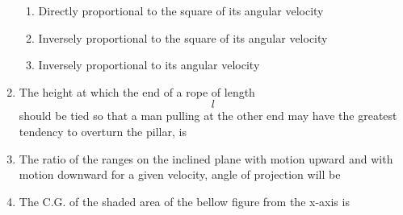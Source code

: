 \documentclass[11pt,a4paper]{article}
\begin{document}
\begin{enumerate}
\begin{enumerate}[label=\Alph*.]
\item{Directly proportional to the square of its angular velocity}
\item{Inversely proportional to the square of its angular velocity}
\item{Inversely proportional to its angular velocity}
\end{enumerate}
\item{The height at which the end of a rope of length $$l$$ should be tied so that a man pulling at the other end may have the greatest tendency to overturn the pillar, is
}
\\
\item{The ratio of the ranges on the inclined plane with motion upward and with motion downward for a given velocity, angle of projection will be}
\\\begin{enumerate*}[itemjoin=\qquad, label=\Alph*.]
\item{$ \frac{{\sin \left( {\alpha + \beta } \right)}}{{\sin \left( {\alpha - \beta } \right)}} $}
\item{$ \frac{{\sin \left( {\alpha - \beta } \right)}}{{\sin \left( {\alpha + \beta } \right)}} $}
\item{$ \frac{{\cos \left( {\alpha - \beta } \right)}}{{\cos \left( {\alpha + \beta } \right)}} $}
\item{$ \frac{{\tan \left( {\alpha - \beta } \right)}}{{\tan \left( {\alpha + \beta } \right)}} $}
\end{enumerate*}
\item{The C.G. of the shaded area of the bellow figure from the x-axis is \\

}
\end{enumerate}
\end{document}
